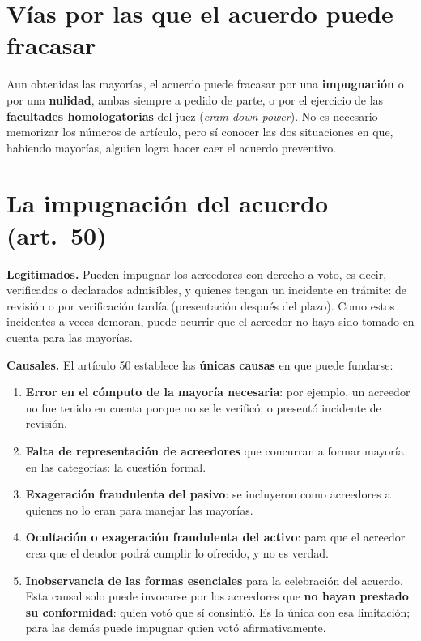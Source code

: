 \documentclass[12pt,oneside]{book}
\begin{document}
\section{Vías por las que el acuerdo puede fracasar}

Aun obtenidas las mayorías, el acuerdo puede fracasar por una \textbf{impugnación} o por una \textbf{nulidad}, ambas siempre a pedido de parte, o por el ejercicio de las \textbf{facultades homologatorias} del juez (\emph{cram down power}). No es necesario memorizar los números de artículo, pero sí conocer las dos situaciones en que, habiendo mayorías, alguien logra hacer caer el acuerdo preventivo.

\section{La impugnación del acuerdo (art.\ 50)}

\textbf{Legitimados.} Pueden impugnar los acreedores con derecho a voto, es decir, verificados o declarados admisibles, y quienes tengan un incidente en trámite: de revisión o por verificación tardía (presentación después del plazo). Como estos incidentes a veces demoran, puede ocurrir que el acreedor no haya sido tomado en cuenta para las mayorías.

\textbf{Causales.} El artículo 50 establece las \textbf{únicas causas} en que puede fundarse:
\begin{enumerate}
    \item \textbf{Error en el cómputo de la mayoría necesaria}: por ejemplo, un acreedor no fue tenido en cuenta porque no se le verificó, o presentó incidente de revisión.
    \item \textbf{Falta de representación de acreedores} que concurran a formar mayoría en las categorías: la cuestión formal.
    \item \textbf{Exageración fraudulenta del pasivo}: se incluyeron como acreedores a quienes no lo eran para manejar las mayorías.
    \item \textbf{Ocultación o exageración fraudulenta del activo}: para que el acreedor crea que el deudor podrá cumplir lo ofrecido, y no es verdad.
    \item \textbf{Inobservancia de las formas esenciales} para la celebración del acuerdo. Esta causal solo puede invocarse por los acreedores que \textbf{no hayan prestado su conformidad}: quien votó que sí consintió. Es la única con esa limitación; para las demás puede impugnar quien votó afirmativamente.
\end{enumerate}
\end{document}
